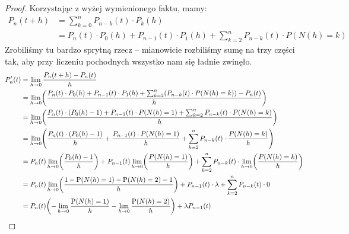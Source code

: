 \begin{proof}
	Korzystając z wyżej wymienionego faktu, mamy:
	\begin{align*}
		P_n(t + h)
		 & = \sum_{k=0}^n P_{n-k}(t) \cdot P_k(h)                                                      \\
		 & = P_n(t) \cdot P_0(h) + P_{n-1}(t) \cdot P_1(h) + \sum_{k=2}^n P_{n-k}(t) \cdot P(N(h) = k)
	\end{align*}
	Zrobiliśmy tu bardzo sprytną rzecz -- mianowicie rozbiliśmy sumę na trzy części tak, aby przy liczeniu pochodnych wszystko nam się ładnie zwinęło.
	\begin{align*}
		P_n'(t)
		 & = \lim_{h \rightarrow 0} \frac{P_n(t + h) - P_n(t)}{h}                                                                                                                                                         \\
		 & =  \lim_{h \rightarrow 0} \pars{ \frac{
				P_n(t) \cdot P_0(h) + P_{n-1}(t) \cdot P_1(h) + \sum_{k=2}^n \pars{P_{n-k}(t) \cdot P(N(h) = k)} - P_n(t)}{h}
		}                                                                                                                                                                                                                 \\
		 & =  \lim_{h \rightarrow 0} \pars{ \frac{
				P_n(t) \cdot (P_0(h) - 1) + P_{n-1}(t) \cdot P(N(h)=1) + \sum_{k=2}^n P_{n-k}(t) \cdot P(N(h) = k)}{h}
		}                                                                                                                                                                                                                 \\
		 & =  \lim_{h \rightarrow 0} \pars{
			\frac{P_n(t) \cdot (P_0(h) - 1)}{h}
			+ \frac{P_{n-1}(t)\cdot P(N(h) = 1)}{h}
		+ \sum_{k=2}^n P_{n-k}(t) \cdot \frac{P(N(h) = k)}{h}}                                                                                                                                                            \\
		 & = P_n(t) \lim_{h \rightarrow 0} \pars{\frac{P_0(h) - 1}{h}} + P_{n-1}(t) \lim_{h \rightarrow 0} \pars{\frac{P(N(h)=1)}{h}} + \sum_{k=2}^n P_{n-k}(t) \cdot \lim_{h \rightarrow 0} \pars{\frac{P(N(h) = k)}{h}} \\
		 & = P_n(t) \lim_{h \rightarrow 0} \pars{\frac{1 - \mathrm{P}(N(h) = 1) - \mathrm{P}(N(h) = 2) - 1}{h}} + P_{n-1}(t) \cdot \lambda + \sum_{k=2}^n P_{n-k}(t) \cdot 0                                              \\
		 & = P_n(t) \pars{-\lim_{h \rightarrow 0}\frac{\mathrm{P}(N(h)=1)}{h} - \lim_{h \rightarrow 0} \frac{\mathrm{P}(N(h)=2)}{h}} + \lambda P_{n-1}(t)                                                                 \\

\end{align*}
\end{proof}
